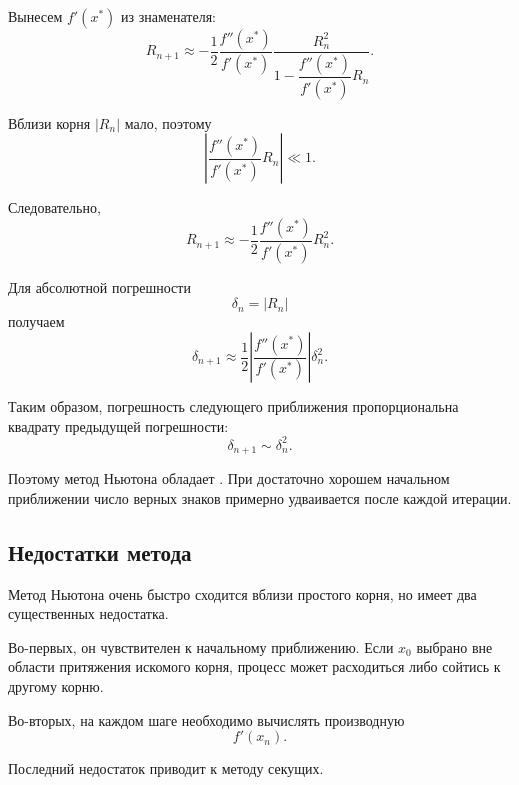 \documentclass[../final.tex]{subfiles}
\begin{document}
Вынесем $f'(x^*)$ из знаменателя:
%
\begin{equation*}
    R_{n+1}
    \approx
    -
    \frac12
    \frac{f''(x^*)}{f'(x^*)}
    \frac{R_n^2}
    {1-\dfrac{f''(x^*)}{f'(x^*)}R_n}.
\end{equation*}

Вблизи корня $|R_n|$ мало, поэтому
%
\begin{equation*}
    \left|
        \frac{f''(x^*)}{f'(x^*)}R_n
    \right|
    \ll1.
\end{equation*}

Следовательно,
%
\begin{equation*}
    R_{n+1}
    \approx
    -
    \frac12
    \frac{f''(x^*)}{f'(x^*)}
    R_n^2.
\end{equation*}

Для абсолютной погрешности
%
\begin{equation*}
    \delta_n=|R_n|
\end{equation*}
%
получаем
%
\begin{equation*}
    \delta_{n+1}
    \approx
    \frac12
    \left|
        \frac{f''(x^*)}{f'(x^*)}
    \right|
    \delta_n^2.
\end{equation*}

Таким образом, погрешность следующего приближения пропорциональна
квадрату предыдущей погрешности:
%
\begin{equation*}
    \delta_{n+1}\sim\delta_n^2.
\end{equation*}

Поэтому метод Ньютона обладает .
При достаточно хорошем начальном приближении число верных знаков
примерно удваивается после каждой итерации.


\subsection{Недостатки метода}

Метод Ньютона очень быстро сходится вблизи простого корня, но имеет
два существенных недостатка.

Во-первых, он чувствителен к начальному приближению. Если $x_0$
выбрано вне области притяжения искомого корня, процесс может
расходиться либо сойтись к другому корню.

Во-вторых, на каждом шаге необходимо вычислять производную
%
\begin{equation*}
    f'(x_n).
\end{equation*}

Последний недостаток приводит к методу секущих.
\end{document}
